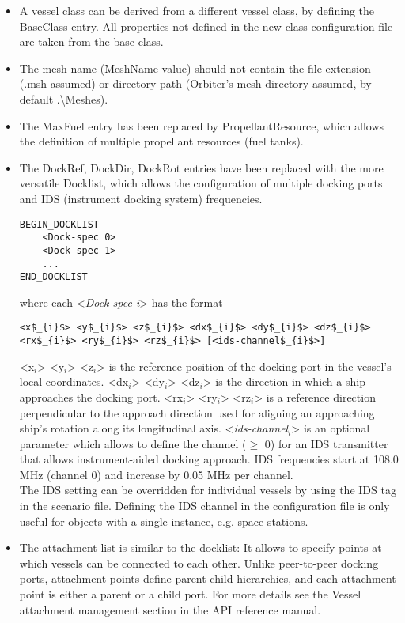\documentclass[Orbiter Developer Manual.tex]{subfiles}
\begin{document}
\begin{itemize}
\item A vessel class can be derived from a different vessel class, by defining the BaseClass entry. All properties not defined in the new class configuration file are taken from the base class.
\item The mesh name (MeshName value) should not contain the file extension (.msh assumed) or directory path (Orbiter's mesh directory assumed, by default .\textbackslash Meshes).
\item The MaxFuel entry has been replaced by PropellantResource, which allows the definition of multiple propellant resources (fuel tanks).
\item The DockRef, DockDir, DockRot entries have been replaced with the more versatile Docklist, which allows the configuration of multiple docking ports and IDS (instrument docking system) frequencies.

\begin{lstlisting}[language=OSFS]
BEGIN_DOCKLIST
	<Dock-spec 0>
	<Dock-spec 1>
	...
END_DOCKLIST
\end{lstlisting}

\noindent
where each <\textit{Dock-spec i}> has the format

\begin{lstlisting}[language=OSFS,mathescape=true]
<x$_{i}$> <y$_{i}$> <z$_{i}$> <dx$_{i}$> <dy$_{i}$> <dz$_{i}$> <rx$_{i}$> <ry$_{i}$> <rz$_{i}$> [<ids-channel$_{i}$>]
\end{lstlisting}

\noindent
<x$_{i}$> <y$_{i}$> <z$_{i}$> is the reference position of the docking port in the vessel's local coordinates. <dx$_{i}$> <dy$_{i}$> <dz$_{i}$> is the direction in which a ship approaches the docking port. <rx$_{i}$> <ry$_{i}$> <rz$_{i}$> is a reference direction perpendicular to the approach direction used for aligning an approaching ship's rotation along its longitudinal axis. <\textit{ids-channel}$_{i}$> is an optional parameter which allows to define the channel ($\geq$ 0) for an IDS transmitter that allows instrument-aided docking approach. IDS frequencies start at 108.0 MHz (channel 0) and increase by 0.05 MHz per channel.\\
The IDS setting can be overridden for individual vessels by using the IDS tag in the scenario file. Defining the IDS channel in the configuration file is only useful for objects with a single instance, e.g. space stations.

\item The attachment list is similar to the docklist: It allows to specify points at which vessels can be connected to each other. Unlike peer-to-peer docking ports, attachment points define parent-child hierarchies, and each attachment point is either a parent or a child port. For more details see the Vessel attachment management section in the API reference manual.


\end{itemize}
\end{document}
